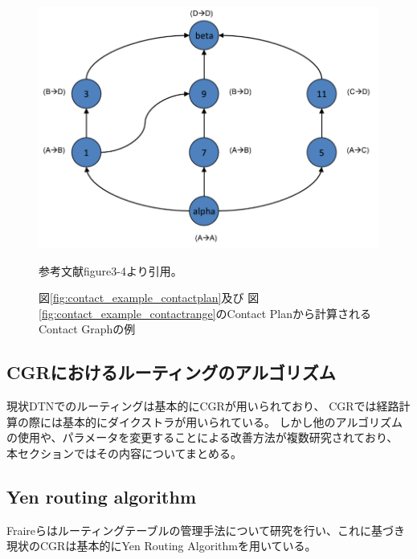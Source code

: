 \begin{figure}[tbh]
    \centering
    \includegraphics[width=0.5\textheight]{img/contact_example_contactgraph.pdf}
    \caption{図\ref{fig:contact_example_contactplan}及び
    図\ref{fig:contact_example_contactrange}のContact Planから計算されるContact Graphの例}
    \label{fig:contact_example_contactgraph}
    \begin{minipage}{\textwidth}
        \centering
        \vspace{3mm}
        参考文献\cite{schedule_aware_bundle_routing}figure3-4より引用。
    \end{minipage}
\end{figure}
\label{chap:related_works}


\subsection{CGRにおけるルーティングのアルゴリズム}
\label{subsection:宇宙インターネットにおけるルーティングのアルゴリズム}    
現状DTNでのルーティングは基本的にCGRが用いられており、
CGRでは経路計算の際には基本的にダイクストラが用いられている。
しかし他のアルゴリズムの使用や、パラメータを変更することによる改善方法が複数研究されており、
本セクションではその内容についてまとめる。
\subsection{Yen routing algorithm}
\label{subsection:Yen routing algorithm}
Fraireらはルーティングテーブルの管理手法について研究を行い、これに基づき現状のCGRは基本的にYen Routing Algorithmを用いている。\cite{FRAIRE2018}

